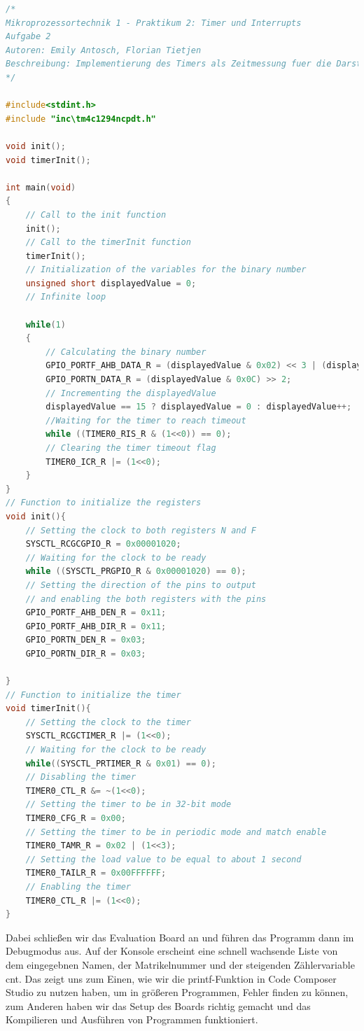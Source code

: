 \documentclass{report}
\begin{document}
\begin{lstlisting}[language=c, caption={timer.c}, captionpos=b]
/*
Mikroprozessortechnik 1 - Praktikum 2: Timer und Interrupts
Aufgabe 2
Autoren: Emily Antosch, Florian Tietjen
Beschreibung: Implementierung des Timers als Zeitmessung fuer die Darstellung von Binaerzahlen mithilfe von LEDs auf dem Evaluation Board.
*/

#include<stdint.h>
#include "inc\tm4c1294ncpdt.h"

void init();
void timerInit();

int main(void)
{
    // Call to the init function
    init();
    // Call to the timerInit function
    timerInit();
    // Initialization of the variables for the binary number
    unsigned short displayedValue = 0;
    // Infinite loop

    while(1)
    {
        // Calculating the binary number
        GPIO_PORTF_AHB_DATA_R = (displayedValue & 0x02) << 3 | (displayedValue & 0x01);
        GPIO_PORTN_DATA_R = (displayedValue & 0x0C) >> 2;
        // Incrementing the displayedValue
        displayedValue == 15 ? displayedValue = 0 : displayedValue++;
        //Waiting for the timer to reach timeout
        while ((TIMER0_RIS_R & (1<<0)) == 0);
        // Clearing the timer timeout flag
        TIMER0_ICR_R |= (1<<0);
    }
}
// Function to initialize the registers
void init(){
    // Setting the clock to both registers N and F
    SYSCTL_RCGCGPIO_R = 0x00001020;
    // Waiting for the clock to be ready
    while ((SYSCTL_PRGPIO_R & 0x00001020) == 0);
    // Setting the direction of the pins to output
    // and enabling the both registers with the pins
    GPIO_PORTF_AHB_DEN_R = 0x11;
    GPIO_PORTF_AHB_DIR_R = 0x11;
    GPIO_PORTN_DEN_R = 0x03;
    GPIO_PORTN_DIR_R = 0x03;

}
// Function to initialize the timer
void timerInit(){
    // Setting the clock to the timer
    SYSCTL_RCGCTIMER_R |= (1<<0);
    // Waiting for the clock to be ready
    while((SYSCTL_PRTIMER_R & 0x01) == 0);
    // Disabling the timer
    TIMER0_CTL_R &= ~(1<<0);
    // Setting the timer to be in 32-bit mode
    TIMER0_CFG_R = 0x00;
    // Setting the timer to be in periodic mode and match enable
    TIMER0_TAMR_R = 0x02 | (1<<3);
    // Setting the load value to be equal to about 1 second
    TIMER0_TAILR_R = 0x00FFFFFF;
    // Enabling the timer
    TIMER0_CTL_R |= (1<<0);
}

\end{lstlisting}

Dabei schließen wir das Evaluation Board an und führen das Programm dann im Debugmodus aus.
Auf der Konsole erscheint eine schnell wachsende Liste von dem eingegebnen Namen, der Matrikelnummer und der steigenden Zählervariable cnt. Das zeigt uns zum Einen, wie wir die
printf-Funktion in Code Composer Studio zu nutzen haben, um in größeren Programmen, Fehler finden zu können, zum Anderen haben wir das Setup des Boards richtig gemacht und das Kompilieren und Ausführen von Programmen funktioniert.
\end{document}
